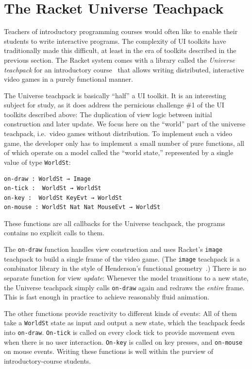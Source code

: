 \documentclass[sigplan,screen]{acmart}
\begin{document}
\section{The Racket Universe Teachpack}
\label{sec:universe-teachpack}

Teachers of introductory programming courses would often like to
enable their students to write interactive programs.  The complexity
of UI toolkits have traditionally made this difficult, at least in the
era of toolkits described in the previous section.  The Racket system
comes with a library called the \textit{Universe teachpack} for an
introductory course~\cite{UniverseTeachpack} that allows writing
distributed, interactive video games in a purely functional manner.

The Universe teachpack is basically ``half'' a UI toolkit.  It is an
interesting subject for study, as it does address the pernicious
challenge \#1 of the UI toolkits described above: The duplication of
view logic between initial construction and later update.  We focus
here on the ``world'' part of the universe teachpack, i.e.\ video
games without distribution.  To implement such a video game, the
developer only has to implement a small number of pure functions, all
of which operate on a model called the ``world state,'' represented by
a single value of type \texttt{WorldSt}:
%
\begin{verbatim}
on-draw : WorldSt → Image
on-tick :  WorldSt → WorldSt
on-key :  WorldSt KeyEvt → WorldSt
on-mouse : WorldSt Nat Nat MouseEvt → WorldSt
\end{verbatim}
%
These functions are all callbacks for the Universe teachpack, the
programs contains no explicit calls to them.

The \texttt{on-draw} function handles view construction and uses Racket's
\texttt{image} teachpack to build a single frame of the video game.
(The \texttt{image} teachpack is a combinator library in the style of
Henderson's functional geometry~\cite{Henderson1982}.)  There is no
separate function for view \emph{update}: Whenever the model
transitions to a new state, the Universe teachpack simply calls
\texttt{on-draw} again and redraws the \emph{entire} frame.  This is
fast enough in practice to achieve reasonably fluid animation.

The other functions provide reactivity to different kinds of events:
All of them take a \texttt{WorldSt} state as input and output a new
state, which the teachpack feeds into \texttt{on-draw}.
\texttt{On-tick} is called on every clock tick to provide movement
even when there is no user interaction.  \texttt{On-key} is called on
key presses, and \texttt{on-mouse} on mouse events.  Writing these
functions is well within the purview of introductory-course students.
\end{document}
